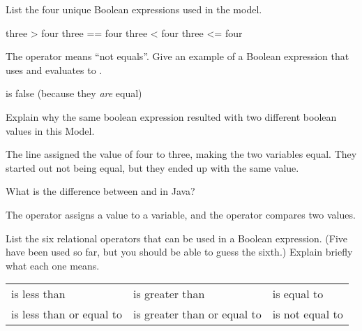 \Q List the four unique Boolean expressions used in the model.

\begin{answer}[3em]
\begin{javaans}
    three > four    three == four    three < four    three <= four
\end{javaans}
\end{answer}


\Q The \java{!=} operator means ``not equals''.
Give an example of a Boolean expression that uses \java{!=} and evaluates to .

\begin{answer}[3em]
 is false (because they \emph{are} equal)
\end{answer}


\Q Explain why the same boolean expression  resulted with two different boolean values in this Model.

\begin{answer}
The line  assigned the value of four to three, making the two variables equal.
They started out not being equal, but they ended up with the same value.
\end{answer}


\Q What is the difference between \java{=} and \java{==} in Java?

\begin{answer}
The \java{=} operator assigns a value to a variable, and the \java{==} operator compares two values.
\end{answer}


\Q List the six relational operators that can be used in a Boolean expression.
(Five have been used so far, but you should be able to guess the sixth.)
Explain briefly what each one means.

\begin{answer}
\begin{tabular}{lll}
\java{<} is less than              & \java{>} is greater than              & \java{==} is equal to     \\
\java{<=} is less than or equal to & \java{>=} is greater than or equal to & \java{!=} is not equal to \\
\end{tabular}
\end{answer}
